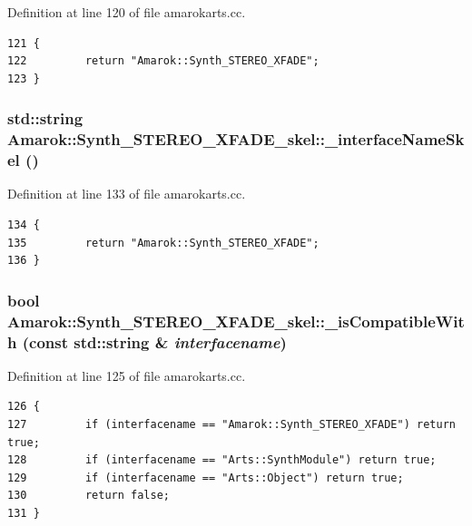 Definition at line 120 of file amarokarts.cc.



\footnotesize\begin{verbatim}121 {
122         return "Amarok::Synth_STEREO_XFADE";
123 }
\end{verbatim}\normalsize 
{}
\subsubsection{\setlength{\rightskip}{0pt plus 5cm}std::string Amarok::Synth\_\-STEREO\_\-XFADE\_\-skel::\_\-interface\-Name\-Skel ()\hspace{0.3cm}{\tt  [static]}}\label{classAmarok_1_1Synth__STEREO__XFADE__skel_Amarok_1_1Synth__STEREO__XFADE__skele0}




Definition at line 133 of file amarokarts.cc.



\footnotesize\begin{verbatim}134 {
135         return "Amarok::Synth_STEREO_XFADE";
136 }
\end{verbatim}\normalsize 
{}
\subsubsection{\setlength{\rightskip}{0pt plus 5cm}bool Amarok::Synth\_\-STEREO\_\-XFADE\_\-skel::\_\-is\-Compatible\-With (const std::string \& {\em interfacename})}\label{classAmarok_1_1Synth__STEREO__XFADE__skel_Amarok_1_1Synth__STEREO__XFADE__skela2}




Definition at line 125 of file amarokarts.cc.



\footnotesize\begin{verbatim}126 {
127         if (interfacename == "Amarok::Synth_STEREO_XFADE") return true;
128         if (interfacename == "Arts::SynthModule") return true;
129         if (interfacename == "Arts::Object") return true;
130         return false;
131 }
\end{verbatim}\normalsize 
{}
